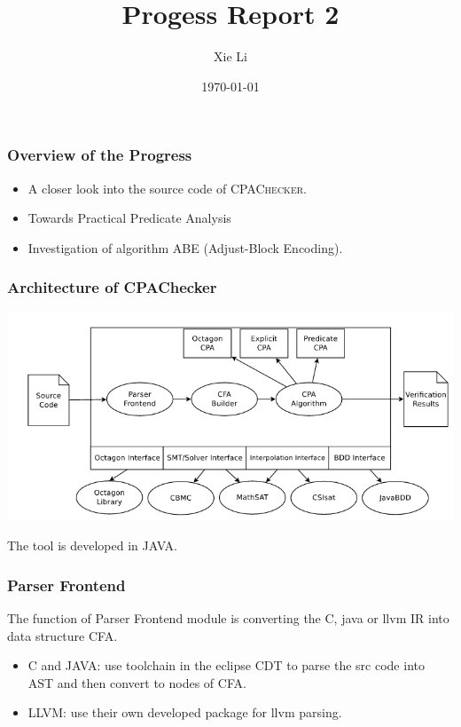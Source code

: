 \documentclass[11pt]{beamer}
\title{Progess Report 2}
\date{\today}
\author{Xie Li}
\begin{document}
\maketitle

\begin{frame}\frametitle{Overview of the Progress}
\begin{itemize}
\item A closer look into the source code of \textsc{CPAChecker}.

\item Towards Practical Predicate Analysis
\item Investigation of algorithm ABE (Adjust-Block Encoding).

\end{itemize}

\end{frame}

\begin{frame}\frametitle{Architecture of CPAChecker}
\begin{center}
\includegraphics[scale=0.4]{cpa_arch.png}
\end{center}
The tool is developed in JAVA.
\end{frame}

\begin{frame}\frametitle{Parser Frontend}
The function of Parser Frontend module is converting the C, java or llvm IR into data structure CFA.

\begin{itemize}
\item C and JAVA: use toolchain in the eclipse CDT to parse the src code into AST and then convert to nodes of CFA.
\item LLVM: use their own developed package for llvm parsing.
\end{itemize}
\end{frame}
\end{document}
